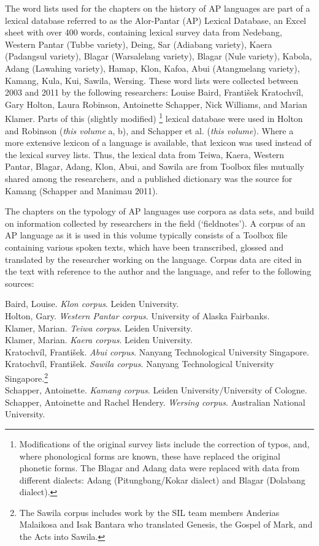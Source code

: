 The word lists used for the chapters on the history of AP languages are part of a lexical database referred to as the Alor-Pantar (AP) Lexical Database, an Excel sheet with over  400 words, containing lexical survey data from Nedebang, Western Pantar (Tubbe variety), Deing, Sar (Adiabang variety), Kaera (Padangsul variety), Blagar (Warsalelang variety), Blagar (Nule variety), Kabola, Adang (Lawahing variety), Hamap, Klon, Kafoa, Abui (Atangmelang variety), Kamang, Kula, Kui, Sawila, Wersing. These word lists were collected between 2003 and 2011 by the following researchers: Louise Baird, Franti\v{s}ek Kratochv\'il, Gary Holton, Laura Robinson, Antoinette Schapper, Nick Williams, and Marian Klamer. Parts of this (slightly modified){} \footnote{Modifications of the original survey lists include the correction of typos, and, where phonological forms are known, these have replaced the original phonetic forms. The Blagar and Adang data were replaced with data from different dialects: Adang (Pitungbang/Kokar dialect) and Blagar (Dolabang dialect).} lexical database were used in Holton and Robinson (\textit{this volume} a, b), and Schapper et al. (\textit{this volume}). Where a more extensive lexicon of a language is available, that lexicon was used instead of the lexical survey lists. Thus, the lexical data from Teiwa, Kaera, Western Pantar, Blagar, Adang, Klon, Abui, and Sawila are from Toolbox files mutually shared among the researchers, and a published dictionary was the source for Kamang (Schapper and Manimau 2011).

The chapters on the typology of AP languages use corpora as data sets, and build on information collected by researchers in the field (`fieldnotes'). A corpus of an AP language as it is used in this volume typically consists of a Toolbox file containing various spoken texts, which have been transcribed, glossed and translated by the researcher working on the language. Corpus data are cited in the text with reference to the author and the language, and refer to the following sources:

\ea%
\label{ex:36}
Baird, Louise. \textit{Klon corpus}. Leiden University.\\
Holton, Gary. \textit{Western Pantar corpus}. University of Alaska Fairbanks.\\
Klamer, Marian. \textit{Teiwa corpus}. Leiden University.\\
Klamer, Marian. \textit{Kaera corpus}. Leiden University.\\
Kratochv\'il, Franti\v{s}ek. \textit{Abui corpus}. Nanyang Technological University Singapore.\\
Kratochv\'il, Franti\v{s}ek. \textit{Sawila corpus}. Nanyang Technological University Singapore.\footnote{The Sawila corpus includes work by the SIL team members Anderias Malaikosa and Isak Bantara who translated Genesis, the Gospel of Mark, and the Acts into Sawila.} \\
Schapper, Antoinette. \textit{Kamang corpus}. Leiden University/University of Cologne.\\
Schapper, Antoinette and Rachel Hendery. \textit{Wersing corpus}. Australian National University.\\
\z

